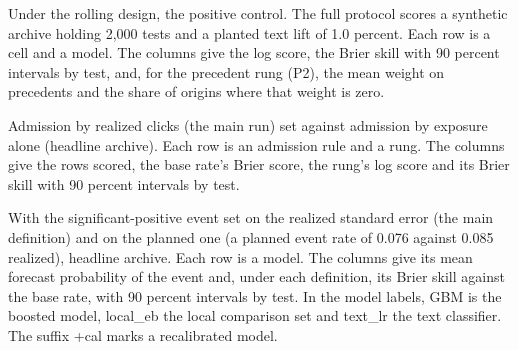 \begin{table}[tp]\centering\scriptsize
\caption{Under the rolling design, the positive control. The full protocol scores a synthetic archive holding 2,000 tests and a planted text lift of 1.0 percent. Each row is a cell and a model. The columns give the log score, the Brier skill with 90 percent intervals by test, and, for the precedent rung (P2), the mean weight on precedents and the share of origins where that weight is zero.}
\label{tab:positive-control}
\resizebox{\columnwidth}{!}{}
\end{table}

\begin{table}[tp]\centering\scriptsize
\caption{Admission by realized clicks (the main run) set against admission by exposure alone (headline archive). Each row is an admission rule and a rung. The columns give the rows scored, the base rate's Brier score, the rung's log score and its Brier skill with 90 percent intervals by test.}
\label{tab:admission}
\resizebox{\columnwidth}{!}{}
\end{table}

\begin{table}[tp]\centering\scriptsize
\caption{With the significant-positive event set on the realized standard error (the main definition) and on the planned one (a planned event rate of 0.076 against 0.085 realized), headline archive. Each row is a model. The columns give its mean forecast probability of the event and, under each definition, its Brier skill against the base rate, with 90 percent intervals by test. In the model labels, GBM is the boosted model, local\_eb the local comparison set and text\_lr the text classifier. The suffix +cal marks a recalibrated model.}
\label{tab:event-definition}
\resizebox{\columnwidth}{!}{}
\end{table}

